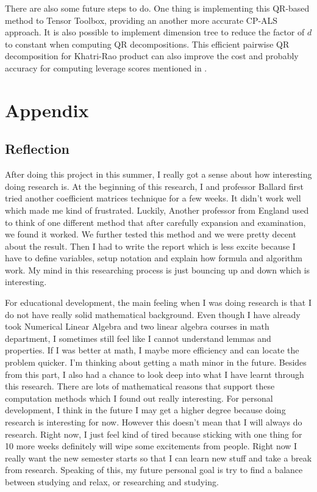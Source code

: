 \documentclass{article}
\begin{document}
There are also some future steps to do. One thing is implementing this QR-based method to Tensor Toolbox, providing an another more accurate CP-ALS approach.
It is also possible to implement dimension tree to reduce the factor of $d$ to constant when computing QR decompositions.
This efficient pairwise QR decomposition for Khatri-Rao product can also improve the cost and probably accuracy for computing leverage scores mentioned in \cite{bharadwaj2023fast}.

\section{Appendix}
\subsection{Reflection}


After doing this project in this summer, I really got a sense about how interesting doing research is.
At the beginning of this research, I and professor Ballard first tried another coefficient matrices technique for a few weeks. 
It didn't work well which made me kind of frustrated. 
Luckily, Another professor from England used to think of one different method that after carefully expansion and examination, we found it worked. 
We further tested this method and we were pretty decent about the result.
Then I had to write the report which is less excite because I have to define variables, setup notation and explain how formula and algorithm work. 
My mind in this researching process is just bouncing up and down which is interesting.

For educational development, the main feeling when I was doing research is that I do not have really solid mathematical background. 
Even though I have already took Numerical Linear Algebra and two linear algebra courses in math department, I sometimes still feel like I cannot understand lemmas and properties. 
If I was better at math, I maybe more efficiency and can locate the problem quicker. 
I'm thinking about getting a math minor in the future. 
Besides from this part, I also had a chance to look deep into what I have learnt through this research.
There are lots of mathematical reasons that support these computation methods which I found out really interesting.
For personal development, I think in the future I may get a higher degree because doing research is interesting for now. 
However this doesn't mean that I will always do research.
Right now, I just feel kind of tired because sticking with one thing for 10 more weeks definitely will wipe some excitements from people.
Right now I really want the new semester starts so that I can learn new stuff and take a break from research.
Speaking of this, my future personal goal is try to find a balance between studying and relax, or researching and studying.






\end{document}
